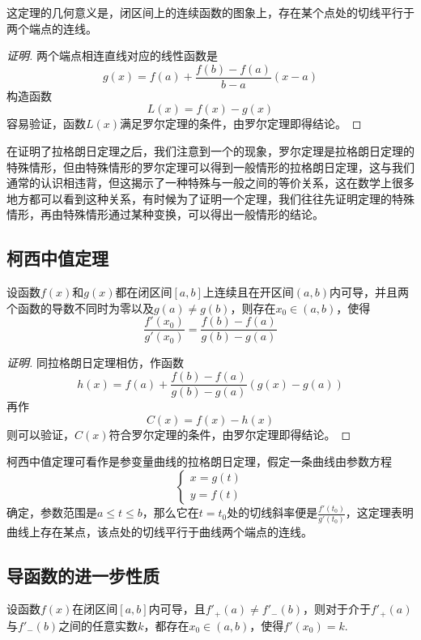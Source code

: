 这定理的几何意义是，闭区间上的连续函数的图象上，存在某个点处的切线平行于两个端点的连线。

\begin{proof}[证明]
  两个端点相连直线对应的线性函数是
  \[ g(x) = f(a) + \frac{f(b)-f(a)}{b-a}(x-a) \]
  构造函数
  \[ L(x) = f(x)-g(x) \]
  容易验证，函数$L(x)$满足罗尔定理的条件，由罗尔定理即得结论。
\end{proof}

在证明了拉格朗日定理之后，我们注意到一个的现象，罗尔定理是拉格朗日定理的特殊情形，但由特殊情形的罗尔定理可以得到一般情形的拉格朗日定理，这与我们通常的认识相违背，但这揭示了一种特殊与一般之间的等价关系，这在数学上很多地方都可以看到这种关系，有时候为了证明一个定理，我们往往先证明定理的特殊情形，再由特殊情形通过某种变换，可以得出一般情形的结论。

\subsection{柯西中值定理}
\label{sec:cauchy-middle-value-theorem}

\begin{theorem}
  设函数$f(x)$和$g(x)$都在闭区间$[a,b]$上连续且在开区间$(a,b)$内可导，并且两个函数的导数不同时为零以及$g(a) \neq g(b)$，则存在$x_0 \in (a,b)$，使得
  \[ \frac{f'(x_0)}{g'(x_0)} = \frac{f(b)-f(a)}{g(b)-g(a)} \]
\end{theorem}

\begin{proof}[证明]
  同拉格朗日定理相仿，作函数
  \[ h(x) = f(a) + \frac{f(b)-f(a)}{g(b)-g(a)}(g(x)-g(a)) \]
  再作
  \[ C(x) = f(x) - h(x) \]
  则可以验证，$C(x)$符合罗尔定理的条件，由罗尔定理即得结论。
\end{proof}

柯西中值定理可看作是参变量曲线的拉格朗日定理，假定一条曲线由参数方程
\[
  \begin{cases}
    x = g(t) \\
    y = f(t)
  \end{cases}
\]
确定，参数范围是$a \leqslant t \leqslant b$，那么它在$t=t_0$处的切线斜率便是$\frac{f'(t_0)}{g'(t_0)}$，这定理表明曲线上存在某点，该点处的切线平行于曲线两个端点的连线。

\subsection{导函数的进一步性质}
\label{sec:some-perproties-of-derivative-function}

\begin{theorem}[导函数介值定理]
  \label{theorem:value-range-of-derived-function}
  设函数$f(x)$在闭区间$[a,b]$内可导，且$f'_+(a) \neq f'_-(b)$，则对于介于$f'_+(a)$与$f'_-(b)$之间的任意实数$k$，都存在$x_0 \in (a,b)$，使得$ f'(x_0) = k $.
\end{theorem}

